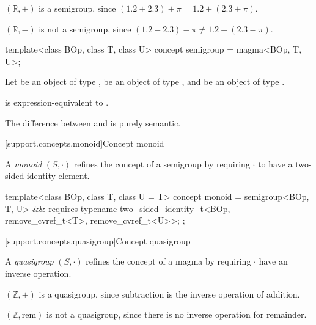 \pnum
\begin{example}
   $(\mathbb{R}, +)$ is a semigroup, since $(1.2 + 2.3) + \pi = 1.2 + (2.3 + \pi)$.
\end{example}

\pnum
\begin{example}
   $(\mathbb{R}, -)$ is not a semigroup, since $(1.2 - 2.3) - \pi \neq 1.2 - (2.3 - \pi)$.
\end{example}

\begin{itemdecl}
  template<class BOp, class T, class U>
  concept semigroup = magma<BOp, T, U>;
\end{itemdecl}
\begin{itemdescr}
   \pnum
   Let  be an object of type ,  be an object of type , and
    be an object of type .

   \pnum
    is expression-equivalent to
   .

   \pnum
   \begin{note}
      The difference between  and  is purely semantic.
   \end{note}
\end{itemdescr}

[support.concepts.monoid]{Concept monoid}

\pnum
A \textit{monoid} $(S, \cdot)$ refines the concept of a semigroup by requiring $\cdot$ to have a
two-sided identity element.

\begin{itemdecl}
  template<class BOp, class T, class U = T>
  concept monoid = semigroup<BOp, T, U> && requires {
    typename two_sided_identity_t<BOp, remove_cvref_t<T>, remove_cvref_t<U>>;
  };
\end{itemdecl}

[support.concepts.quasigroup]{Concept quasigroup}

\pnum
A \textit{quasigroup} $(S, \cdot)$ refines the concept of a magma by requiring $\cdot$ have an
inverse operation.

\begin{example}
   $(\mathbb{Z}, +)$ is a quasigroup, since subtraction is the inverse operation of addition.
\end{example}

\begin{example}
   $(\mathbb{Z}, \text{rem})$ is not a quasigroup, since there is no inverse operation for remainder.
\end{example}

